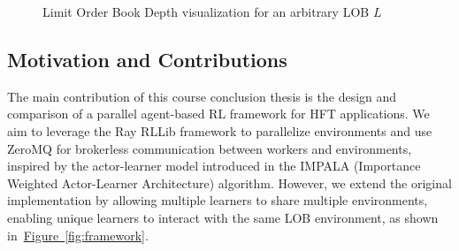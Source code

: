 \begin{figure}[H]
    \centering
    \caption{Limit Order Book Depth visualization for an arbitrary LOB $L$}
    \label{fig:lob}
\end{figure}

\subsection{Motivation and Contributions}

The main contribution of this course conclusion thesis is the design and comparison of a parallel agent-based RL framework for HFT applications.
We aim to leverage the Ray RLLib framework to parallelize environments and use ZeroMQ for brokerless communication between workers and environments,
inspired by the actor-learner model introduced in the IMPALA (Importance Weighted Actor-Learner Architecture) algorithm.
However, we extend the original implementation by allowing multiple learners to share multiple environments,
enabling unique learners to interact with the same LOB environment, as shown in~\hyperref[fig:framework]{Figure~\ref{fig:framework}}.

